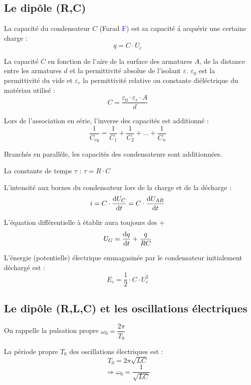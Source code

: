 \documentclass[main.tex]{subfiles}
\begin{document}
\subsection{Le dipôle (R,C)}
\begin{Definition}
    La capacité du condensateur $C$ (Farad \textcolor{blue}{F}) est sa capacité á acquérir une certaine charge :
    $$q = C \cdot U_{c}$$

    La capacité $C$ en fonction de l'aire de la surface des armatures $A$, de la distance entre les armatures $d$ et la permittivité absolue de l'isolant $\varepsilon$. $\varepsilon_{0}$ est la permittivité du vide et $\varepsilon_{r}$ la permittivité relative ou constante diéléctrique du matériau utilisé :
    $$C = \dfrac{\varepsilon_{0} \cdot \varepsilon_{r} \cdot A}{d}$$

    Lors de l'association en série, l'inverse des capacités est additionné :
    $$\dfrac{1}{C_{eq}} = \dfrac{1}{C_{1}} + \dfrac{1}{C_{2}} + ... + \dfrac{1}{C_{n}}$$

    Branchés en parallèle, les capacités des condensateurs sont additionnées.

    La constante de temps $\tau$ : \qquad $\tau = R \cdot C$

    L'intensité aux bornes du condensateur lors de la charge et de la décharge : 
    $$i = C \cdot \dfrac{\text{d} U_{C}}{\text{d} t} = C \cdot \dfrac{\text{d} U_{AB}}{\text{d} t}$$

    L'équation différentielle à établir aura toujours des $+$ 
    $$U_{G}  = \dfrac{\text{d} q}{\text{d} t} + \dfrac{q}{RC} $$

    L'énergie (potentielle) électrique emmagasinée par le condensateur initialement déchargé est :
    $$E_{c} = \dfrac{1}{2} \cdot C \cdot U_{c}^2$$
\end{Definition}


\subsection{Le dipôle (R,L,C) et les oscillations électriques}
\begin{Definition}
    On rappelle la pulsation propre $\omega_{0} = \dfrac{2\pi}{T_{0}} $

    La période propre $T_{0}$ des oscillations électriques est :
    $$T_{0} = 2 \pi \sqrt{LC}$$
    $$\Rightarrow \omega_{0} = \dfrac{1}{\sqrt{LC}}$$
\end{Definition}
\end{document}
